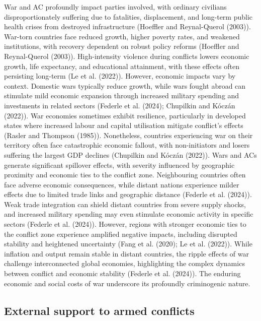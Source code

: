 \documentclass[
]{article}
\begin{document}
War and AC profoundly impact parties involved, with ordinary civilians
disproportionately suffering due to fatalities, displacement, and
long-term public health crises from destroyed infrastructure (Hoeffler
and Reynal-Querol (2003)). War-torn countries face reduced growth,
higher poverty rates, and weakened institutions, with recovery dependent
on robust policy reforms (Hoeffler and Reynal-Querol (2003)).
High-intensity violence during conflicts lowers economic growth, life
expectancy, and educational attainment, with these effects often
persisting long-term (Le et al. (2022)). However, economic impacts vary
by context. Domestic wars typically reduce growth, while wars fought
abroad can stimulate mild economic expansion through increased military
spending and investments in related sectors (Federle et al. (2024);
Chupilkin and Kóczán (2022)). War economies sometimes exhibit
resilience, particularly in developed states where increased labour and
capital utilisation mitigate conflict's effects (Rasler and Thompson
(1985)). Nonetheless, countries experiencing war on their territory
often face catastrophic economic fallout, with non-initiators and losers
suffering the largest GDP declines (Chupilkin and Kóczán (2022)). Wars
and ACs generate significant spillover effects, with severity influenced
by geographic proximity and economic ties to the conflict zone.
Neighbouring countries often face adverse economic consequences, while
distant nations experience milder effects due to limited trade links and
geographic distance (Federle et al. (2024)). Weak trade integration can
shield distant countries from severe supply shocks, and increased
military spending may even stimulate economic activity in specific
sectors (Federle et al. (2024)). However, regions with stronger economic
ties to the conflict zone experience amplified negative impacts,
including disrupted stability and heightened uncertainty (Fang et al.
(2020); Le et al. (2022)). While inflation and output remain stable in
distant countries, the ripple effects of war challenge interconnected
global economies, highlighting the complex dynamics between conflict and
economic stability (Federle et al. (2024)). The enduring economic and
social costs of war underscore its profoundly criminogenic nature.

\subsection{External support to armed
conflicts}\label{external-support-to-armed-conflicts}
\end{document}
